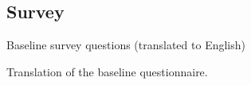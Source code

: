 %       

\newpage
\subsection{Survey}   \label{app:survey_data}



\normalsize
\linespread{1.05}
\normalsize
\linespread{1.05}

\begin{table}[H]
\caption{Baseline survey questions (translated to English)}
\label{baseline_survey}
\begin{center}
\scriptsize{}
\end{center}
\scriptsize{
Translation of the baseline questionnaire.}
\end{table}

